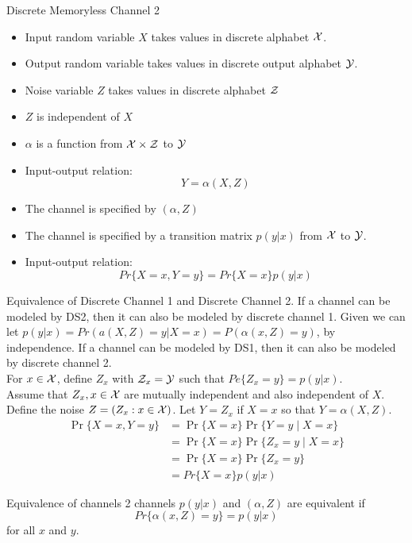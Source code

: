 \documentclass[../main.tex]{subfiles}
\begin{document}
 \begin{pbox}{Discrete Memoryless Channel 2}
\begin{itemize}
    \item Input random variable $X$ takes values in discrete alphabet $\mathcal{X}$.
    \item Output random variable takes values in discrete output alphabet $\mathcal{Y}$.
    \item Noise variable $Z$ takes values in discrete alphabet $\mathcal{Z}$
    \item $Z$ is independent of $X$
    \item $\alpha$ is a function from $\mathcal{X}\times \mathcal{Z}$ to $\mathcal{Y}$  
    \item Input-output relation: \[
    Y=\alpha(X,Z)
    \]
    \item The channel is specified by $(\alpha, Z)$
    \item The channel is specified by a transition matrix $p(y|x)$ from $\mathcal{X}$ to $\mathcal{Y}$.
    \item Input-output relation: \[
    Pr\{X=x, Y=y\}=Pr\{X=x\} p(y|x)
    \] 
\end{itemize}
\end{pbox}
Equivalence of Discrete Channel 1 and Discrete Channel 2.
\newline
If a channel can be modeled by DS2, then it can also be modeled by discrete channel 1. Given we can let $p(y|x)=Pr(a(X,Z)=y|X=x) = P(\alpha(x,Z)=y)$, by independence.
\newline
If a channel can be modeled by DS1, then it can also be modeled by discrete channel 2.\\
For $x\in \mathcal{X}$, define $Z_x$ with $\mathcal{Z}_x=\mathcal{Y}$ such that $Pe\{Z_x=y\}=p(y|x)$.\\
Assume that $Z_x,x\in\mathcal{X}$ are mutually independent and also independent of $X$.\\
Define the noise $Z=(Z_x:x\in\mathcal{X})$.
Let $Y=Z_x$ if $X=x$ so that $Y=\alpha(X,Z)$.
\newline
\begin{align*}
\Pr\{X = x, Y = y\} &= \Pr\{X = x\}\Pr\{Y = y \mid X = x\} \\
&= \Pr\{X = x\}\Pr\{Z_x = y \mid X = x\} \\
&= \Pr\{X = x\}\Pr\{Z_x = y\}\\
&= Pr\{X=x\}p(y|x)
\end{align*}
\begin{pbox}{Equivalence of channels}
    2 channels $p(y|x)$ and $(\alpha,Z)$ are equivalent if \[
    Pr\{\alpha(x,Z)=y\} = p(y|x)
    \] for all $x$ and $y$.
\end{pbox}
\end{document}
